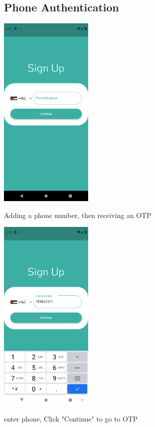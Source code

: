 \documentclass[12pt]{article}
\begin{document}
\begin{figure}[h!]
\subsection*{Phone Authentication}
{\includegraphics[width=0.4\textwidth]{./Screenshots/6.PNG}}
  \caption{Adding a phone number, then receiving an OTP}
\end{figure}


\begin{figure}[h!]
{\includegraphics[width=0.4\textwidth]{./Screenshots/7.PNG}}
  \caption{enter phone, Click "Continue" to go to OTP}
  \end{figure}
\end{document}
